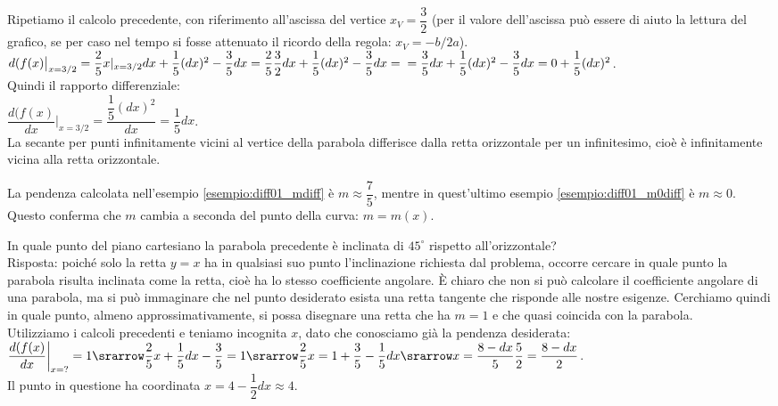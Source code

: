 \begin{esempio}
 \label{esempio:diff01_m0diff}
 Ripetiamo il calcolo precedente, con riferimento all'ascissa del vertice 
 $x_V=\dfrac{3}{2}$ (per il valore dell'ascissa può essere di aiuto la lettura
 del grafico, se per caso nel tempo si fosse attenuato il ricordo della
 regola: $x_V=-b/2a$).\\
 $d(f(x)\big|_{x=3/2}=
  \dfrac{2}{5}x|_{x=3/2} dx+\dfrac{1}{5}(dx)^2-\dfrac{3}{5}dx=
  \dfrac{2}{5}\dfrac{3}{2}dx+\dfrac{1}{5}(dx)^2-\dfrac{3}{5}dx=\\
  =\dfrac{3}{5}dx+\dfrac{1}{5}(dx)^2-\dfrac{3}{5}dx=0+\dfrac{1}{5}(dx)^2$.\\
 Quindi il rapporto differenziale:\\
 $\dfrac{d(f(x)}{dx}\bigg|_{x=3/2}=\dfrac{\dfrac{1}{5}(dx)^2}{dx}
 =\dfrac{1}{5}dx$.\\
 La secante per punti infinitamente vicini al vertice della parabola
 differisce dalla retta orizzontale per un infinitesimo, cioè è
 infinitamente vicina alla retta orizzontale.
\end{esempio}

\begin{osservazione}
La pendenza calcolata nell'esempio \ref{esempio:diff01_mdiff} è 
$m\approx\dfrac{7}{5}$, mentre in quest'ultimo esempio 
\ref{esempio:diff01_m0diff} è
$m\approx 0$. Questo conferma che $m$ cambia a seconda del punto della curva: 
$m=m(x)$.
\end{osservazione}

\begin{esempio}
 In quale punto del piano cartesiano la parabola precedente è inclinata 
 di $45^\circ$ rispetto all'orizzontale?\\
 Risposta: poiché solo la retta $y=x$ ha in qualsiasi suo punto
 l'inclinazione richiesta dal problema, occorre cercare in quale punto
 la parabola risulta inclinata come la retta, cioè ha lo stesso coefficiente 
 angolare. È chiaro che non si può calcolare il coefficiente angolare
 di una parabola, ma si può immaginare che nel punto desiderato esista una retta
 tangente che risponde alle nostre esigenze. Cerchiamo quindi in quale
 punto, almeno approssimativamente, si possa disegnare una retta che ha $m=1$ e
 che quasi coincida con la parabola.\\
 Utilizziamo i calcoli precedenti e teniamo incognita $x$, dato che conosciamo
 già la pendenza desiderata:\\
 $\dfrac{d(f(x)}{dx}\bigg|_{x=?}=1 \srarrow 
 \dfrac{2}{5}x+\dfrac{1}{5}dx-\dfrac{3}{5}=1
 \srarrow \dfrac{2}{5}x=1+\dfrac{3}{5}-\dfrac{1}{5}dx
 \srarrow x=\dfrac{8-dx}{5}\dfrac{5}{2}=\dfrac{8-dx}{2}$.\\
 Il punto in questione ha coordinata $x= 4-\dfrac{1}{2}dx\approx 4$.  
\end{esempio}

